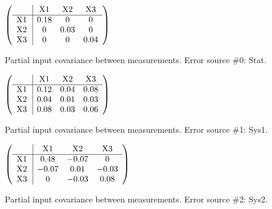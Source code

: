 \begin{table}[H]
\scriptsize
\begin{center}
\renewcommand{\arraystretch}{1.1}
\begin{math}\left(\begin{array}{c|ccc}
 & \mathrm{X1} & 
\mathrm{X2} & 
\mathrm{X3} \\
\hline
\mathrm{X1} \hspace*{2pt} &       0.18 &  0 &  0 \\
\mathrm{X2} \hspace*{2pt} &  0 &       0.03 &  0 \\
\mathrm{X3} \hspace*{2pt} &  0 &  0 &       0.04 \\
\end{array}\right)\end{math}
\caption{Partial input covariance between measurements. Error source \#0: Stat.}
\renewcommand{\arraystretch}{1}
\end{center}
\end{table}
\begin{table}[H]
\scriptsize
\begin{center}
\renewcommand{\arraystretch}{1.1}
\begin{math}\left(\begin{array}{c|ccc}
 & \mathrm{X1} & 
\mathrm{X2} & 
\mathrm{X3} \\
\hline
\mathrm{X1} \hspace*{2pt} &       0.12 &       0.04 &       0.08 \\
\mathrm{X2} \hspace*{2pt} &       0.04 &       0.01 &       0.03 \\
\mathrm{X3} \hspace*{2pt} &       0.08 &       0.03 &       0.06 \\
\end{array}\right)\end{math}
\caption{Partial input covariance between measurements. Error source \#1: Sys1.}
\renewcommand{\arraystretch}{1}
\end{center}
\end{table}
\begin{table}[H]
\scriptsize
\begin{center}
\renewcommand{\arraystretch}{1.1}
\begin{math}\left(\begin{array}{c|ccc}
 & \mathrm{X1} & 
\mathrm{X2} & 
\mathrm{X3} \\
\hline
\mathrm{X1} \hspace*{2pt} &       0.48 &      -0.07 &  0 \\
\mathrm{X2} \hspace*{2pt} &      -0.07 &       0.01 &      -0.03 \\
\mathrm{X3} \hspace*{2pt} &  0 &      -0.03 &       0.08 \\
\end{array}\right)\end{math}
\caption{Partial input covariance between measurements. Error source \#2: Sys2.}
\renewcommand{\arraystretch}{1}
\end{center}
\end{table}
